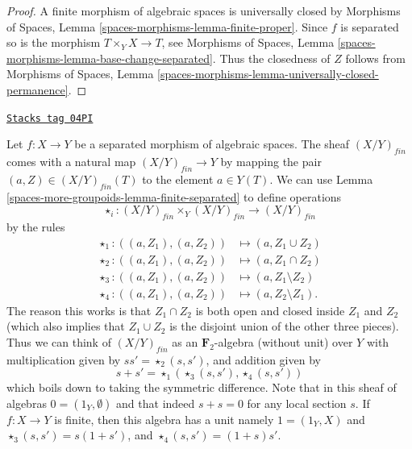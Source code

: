 \begin{proof}
A finite morphism of algebraic spaces is universally closed by
Morphisms of Spaces, Lemma \ref{spaces-morphisms-lemma-finite-proper}.
Since $f$ is separated so is the morphism $T \times_Y X \to T$, see
Morphisms of Spaces, Lemma \ref{spaces-morphisms-lemma-base-change-separated}.
Thus the closedness of $Z$ follows from
Morphisms of Spaces,
Lemma \ref{spaces-morphisms-lemma-universally-closed-permanence}.
\end{proof}

\begin{remark}
\label{spaces-more-groupoids-remark-finite-monoid}
\href{https://stacks.math.columbia.edu/tag/04PI}{\texttt{Stacks tag 04PI}}

Let $f : X \to Y$ be a separated morphism of algebraic spaces.
The sheaf $(X/Y)_{fin}$ comes with a natural map
$(X/Y)_{fin} \to Y$ by mapping the pair $(a, Z) \in (X/Y)_{fin}(T)$
to the element $a \in Y(T)$. We can use
Lemma \ref{spaces-more-groupoids-lemma-finite-separated}
to define operations
$$
\star_i : (X/Y)_{fin} \times_Y (X/Y)_{fin} \longrightarrow (X/Y)_{fin}
$$
by the rules
\begin{align*}
\star_1 : ((a, Z_1), (a, Z_2)) & \longmapsto (a, Z_1 \cup Z_2) \\
\star_2 : ((a, Z_1), (a, Z_2)) & \longmapsto (a, Z_1 \cap Z_2) \\
\star_3 : ((a, Z_1), (a, Z_2)) & \longmapsto (a, Z_1 \setminus Z_2) \\
\star_4 : ((a, Z_1), (a, Z_2)) & \longmapsto (a, Z_2 \setminus Z_1).
\end{align*}
The reason this works is that $Z_1 \cap Z_2$ is both open and closed
inside $Z_1$ and $Z_2$ (which also implies that $Z_1 \cup Z_2$ is
the disjoint union of the other three pieces).
Thus we can think of $(X/Y)_{fin}$ as an $\mathbf{F}_2$-algebra
(without unit) over $Y$ with multiplication given by
$ss' = \star_2(s, s')$, and addition given by
$$
s + s' = \star_1(\star_3(s, s'), \star_4(s, s'))
$$
which boils down to taking the symmetric difference.
Note that in this sheaf of algebras $0 = (1_Y, \emptyset)$
and that indeed $s + s = 0$ for any local section $s$.
If $f : X \to Y$ is finite, then this algebra has a unit namely
$1 = (1_Y, X)$ and $\star_3(s, s') = s(1 + s')$, and
$\star_4(s, s') = (1 + s)s'$.
\end{remark}

